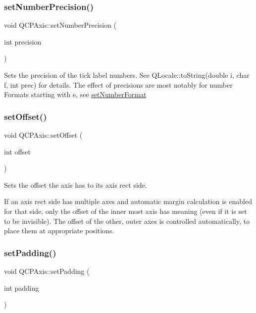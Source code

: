 \subsubsection{\texorpdfstring{set\+Number\+Precision()}{setNumberPrecision()}}
{\footnotesize\ttfamily void Q\+C\+P\+Axis\+::set\+Number\+Precision (\begin{DoxyParamCaption}\item[{int}]{precision }\end{DoxyParamCaption})}

Sets the precision of the tick label numbers. See Q\+Locale\+::to\+String(double i, char f, int prec) for details. The effect of precisions are most notably for number Formats starting with \textquotesingle{}e\textquotesingle{}, see \hyperlink{class_q_c_p_axis_ae585a54dc2aac662e90a2ca82f002590}{set\+Number\+Format} \mbox{\label{class_q_c_p_axis_a04a652603cbe50eba9969ee6d68873c3}} 
\subsubsection{\texorpdfstring{set\+Offset()}{setOffset()}}
{\footnotesize\ttfamily void Q\+C\+P\+Axis\+::set\+Offset (\begin{DoxyParamCaption}\item[{int}]{offset }\end{DoxyParamCaption})}

Sets the offset the axis has to its axis rect side.

If an axis rect side has multiple axes and automatic margin calculation is enabled for that side, only the offset of the inner most axis has meaning (even if it is set to be invisible). The offset of the other, outer axes is controlled automatically, to place them at appropriate positions. \mbox{\label{class_q_c_p_axis_a5691441cb3de9e9844855d339c0db279}} 
\subsubsection{\texorpdfstring{set\+Padding()}{setPadding()}}
{\footnotesize\ttfamily void Q\+C\+P\+Axis\+::set\+Padding (\begin{DoxyParamCaption}\item[{int}]{padding }\end{DoxyParamCaption})}

